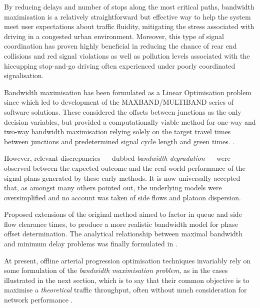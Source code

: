By reducing delays and number of stops along the most critical paths, bandwidth maximisation is a relatively straightforward but effective way to help the system meet user expectations about traffic fluidity, mitigating the stress associated with driving in a congested urban environment. Moreover, this type of signal coordination has proven highly beneficial in reducing the chance of rear end collisions and red signal violations  as well as pollution levels associated with the hiccupping stop-and-go driving often experienced under poorly coordinated signalisation.

Bandwidth maximisation has been formulated as a Linear Optimisation problem since  which led to development of the MAXBAND/MULTIBAND series of software solutions. These considered the offsets between junctions as the only decision variables, but provided a computationally viable method for one-way and two-way bandwidth maximisation relying solely on the target travel times between junctions and predetermined signal cycle length and green times. .

However, relevant discrepancies — dubbed \emph{bandwidth degradation} — were observed between the expected outcome and the real-world performance of the signal plans generated by these early methods. It is now universally accepted that, as  amongst many others pointed out, the underlying models were oversimplified and no account was taken of side flows and platoon dispersion. 

Proposed extensions of the original method aimed to factor in queue and side flow clearance times, to produce a more realistic bandwidth model for phase offset determination. The analytical relationship between maximal bandwidth and minimum delay problems was finally formulated in .

At present, offline arterial progression optimisation techniques invariably rely on some formulation of the \emph{bandwidth maximisation problem}, as in the cases illustrated in the next section, which is to say that their common objective is to maximise a \emph{theoretical} traffic throughput, often without much consideration for network performance .

